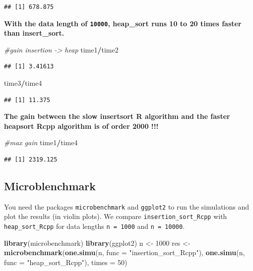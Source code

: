 \documentclass[
]{article}
\newenvironment{Shaded}{\begin{snugshade}}{\end{snugshade}}
\newcommand{\AttributeTok}[1]{\textcolor[rgb]{0.13,0.29,0.53}{#1}}
\newcommand{\CommentTok}[1]{\textcolor[rgb]{0.56,0.35,0.01}{\textit{#1}}}
\newcommand{\DecValTok}[1]{\textcolor[rgb]{0.00,0.00,0.81}{#1}}
\newcommand{\FunctionTok}[1]{\textcolor[rgb]{0.13,0.29,0.53}{\textbf{#1}}}
\newcommand{\NormalTok}[1]{#1}
\newcommand{\OtherTok}[1]{\textcolor[rgb]{0.56,0.35,0.01}{#1}}
\newcommand{\SpecialCharTok}[1]{\textcolor[rgb]{0.81,0.36,0.00}{\textbf{#1}}}
\newcommand{\StringTok}[1]{\textcolor[rgb]{0.31,0.60,0.02}{#1}}
\begin{document}
\begin{verbatim}
## [1] 678.875
\end{verbatim}

\textbf{With the data length of \texttt{10000}, heap\_sort runs 10 to 20
times faster than insert\_sort.}

\begin{Shaded}
\begin{Highlighting}[]
\CommentTok{\#gain insertion {-}\textgreater{} heap}
\NormalTok{time1}\SpecialCharTok{/}\NormalTok{time2}
\end{Highlighting}
\end{Shaded}

\begin{verbatim}
## [1] 3.41613
\end{verbatim}

\begin{Shaded}
\begin{Highlighting}[]
\NormalTok{time3}\SpecialCharTok{/}\NormalTok{time4}
\end{Highlighting}
\end{Shaded}

\begin{verbatim}
## [1] 11.375
\end{verbatim}

\textbf{The gain between the slow insertsort R algorithm and the faster
heapsort Rcpp algorithm is of order 2000 !!!}

\begin{Shaded}
\begin{Highlighting}[]
\CommentTok{\#max gain}
\NormalTok{time1}\SpecialCharTok{/}\NormalTok{time4}
\end{Highlighting}
\end{Shaded}

\begin{verbatim}
## [1] 2319.125
\end{verbatim}

\subsection{Microblenchmark}\label{microblenchmark}

You need the packages \texttt{microbenchmark} and \texttt{ggplot2} to
run the simulations and plot the results (in violin plots). We compare
\texttt{insertion\_sort\_Rcpp} with \texttt{heap\_sort\_Rcpp} for data
lengths \texttt{n\ =\ 1000} and \texttt{n\ =\ 10000}.

\begin{Shaded}
\begin{Highlighting}[]
\FunctionTok{library}\NormalTok{(microbenchmark)}
\FunctionTok{library}\NormalTok{(ggplot2)}
\NormalTok{n }\OtherTok{\textless{}{-}} \DecValTok{1000}
\NormalTok{res }\OtherTok{\textless{}{-}} \FunctionTok{microbenchmark}\NormalTok{(}\FunctionTok{one.simu}\NormalTok{(n, }\AttributeTok{func =} \StringTok{"insertion\_sort\_Rcpp"}\NormalTok{), }\FunctionTok{one.simu}\NormalTok{(n, }\AttributeTok{func =} \StringTok{"heap\_sort\_Rcpp"}\NormalTok{), }\AttributeTok{times =} \DecValTok{50}\NormalTok{)}
\end{Highlighting}
\end{Shaded}
\end{document}
